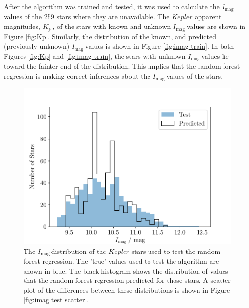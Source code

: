 \documentclass[a4paper,fleqn,usenatbib,useAMS]{mnras}
\newcommand{\kp}{\ensuremath{K_{p}\:}}
\newcommand{\imag}{\ensuremath{I_{\textrm{mag}}\:}}
\begin{document}
After the algorithm was trained and tested, it was used to calculate the \imag values of the 259 stars where they are unavailable. The $Kepler$ apparent magnitudes, \kp, of the stars with known and unknown \imag values are shown in Figure \ref{fig:Kp}. Similarly, the distribution of the known, and predicted (previously unknown) \imag values is shown in Figure \ref{fig:imag train}. In both Figures \ref{fig:Kp} and \ref{fig:imag train}, the stars with unknown \imag values lie toward the fainter end of the distribution. This implies that the random forest regression is making correct inferences about the \imag values of the stars.
\begin{figure}
	\centering
	\includegraphics[scale=0.5]{Plot3_Imag_tested_distribution}
	\caption{The \imag distribution of the $Kepler$ stars used to test the random forest regression. The 'true' values used to test the algorithm are shown in blue. The black histogram shows the distribution of values that the random forest regression predicted for those stars. A scatter plot of the differences between these distributions is shown in Figure \ref{fig:imag test scatter}.}	
	\label{fig:imag test hist}
\end{figure}
\end{document}
